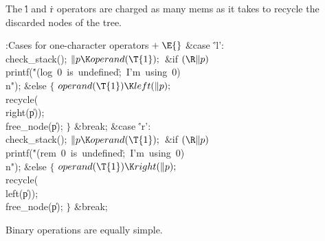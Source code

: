 The \.l and \.r operators are charged as many mems as it takes to
recycle the discarded nodes of the tree.

\Y\B\4:Cases for one-character operators\X${}\mathrel+\E{}$\6
\4\&{case} \.{'l'}:\5
\\{check\_stack}();\6
${}\|p\K\\{operand}(\T{1});{}$\6
\&{if} ${}(\R\|p){}$\1\5
\\{printf}(\.{"(log\ 0\ is\ undefined}\)\.{;\ I'm\ using\ 0)\\n"});\2\6
\&{else}\5
${}\{{}$\1\6
${}\\{operand}(\T{1})\K\\{left}(\|p);{}$\6
\\{recycle}(\\{right}(\|p));\6
\\{free\_node}(\|p);\6
\4${}\}{}$\2\6
\&{break};\6
\4\&{case} \.{'r'}:\5
\\{check\_stack}();\6
${}\|p\K\\{operand}(\T{1});{}$\6
\&{if} ${}(\R\|p){}$\1\5
\\{printf}(\.{"(rem\ 0\ is\ undefined}\)\.{;\ I'm\ using\ 0)\\n"});\2\6
\&{else}\5
${}\{{}$\1\6
${}\\{operand}(\T{1})\K\\{right}(\|p);{}$\6
\\{recycle}(\\{left}(\|p));\6
\\{free\_node}(\|p);\6
\4${}\}{}$\2\6
\&{break};\par
\fi

Binary operations are equally simple.

